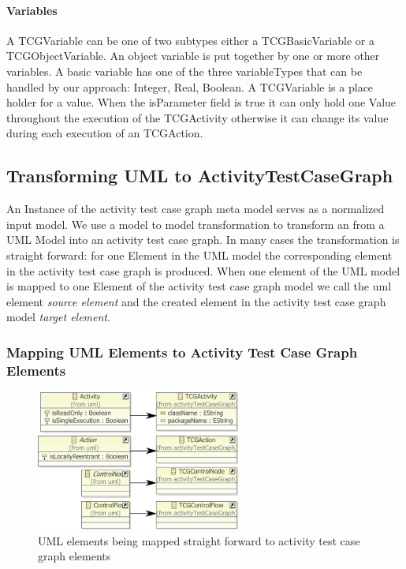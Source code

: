 \paragraph{Variables}
A TCGVariable can be one of two subtypes either a TCGBasicVariable or a TCGObjectVariable. An object variable is put together by one or more other variables. A basic variable has one of the three variableTypes that can be handled by our approach: Integer, Real, Boolean. A TCGVariable is a place holder for a value. When the isParameter field is true it can only hold one Value throughout the execution of the TCGActivity otherwise it can change its value during each execution of an TCGAction.

\subsection{Transforming UML to ActivityTestCaseGraph}
An Instance of the activity test case graph meta model serves as a normalized input model. We use a model to model transformation to transform an  from a UML Model into an activity test case graph. In many cases the transformation is straight forward: for one Element in the UML model the corresponding element in the activity test case graph is produced. When one element of the UML model is mapped to one Element of the activity test case graph model we call the uml element \emph{source element} and the created element in the activity test case graph model \emph{target element}.
\subsubsection{Mapping UML Elements to Activity Test Case Graph Elements}
\begin{figure}
\label{fig:UML2TCGTranformation}
\includegraphics[width=0.6\textwidth]{./pics/UML2TCGTransformation.pdf}
\caption{UML elements being mapped straight forward to activity test case graph elements}
\end{figure}

